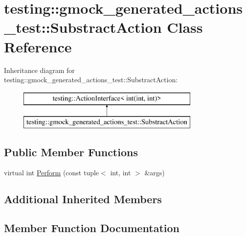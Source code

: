 \hypertarget{classtesting_1_1gmock__generated__actions__test_1_1_substract_action}{}\section{testing\+::gmock\+\_\+generated\+\_\+actions\+\_\+test\+::Substract\+Action Class Reference}
\label{classtesting_1_1gmock__generated__actions__test_1_1_substract_action}
Inheritance diagram for testing\+::gmock\+\_\+generated\+\_\+actions\+\_\+test\+::Substract\+Action\+:\begin{figure}[H]
\begin{center}
\leavevmode
\includegraphics[height=2.000000cm]{d0/df5/classtesting_1_1gmock__generated__actions__test_1_1_substract_action}
\end{center}
\end{figure}
\subsection*{Public Member Functions}
\begin{DoxyCompactItemize}
\item 
virtual int \mbox{\hyperlink{classtesting_1_1gmock__generated__actions__test_1_1_substract_action_ac049ec6196668e17ef7384e08914f2c3}{Perform}} (const tuple$<$ int, int $>$ \&args)
\end{DoxyCompactItemize}
\subsection*{Additional Inherited Members}


\subsection{Member Function Documentation}
\mbox{\label{classtesting_1_1gmock__generated__actions__test_1_1_substract_action_ac049ec6196668e17ef7384e08914f2c3}} 
